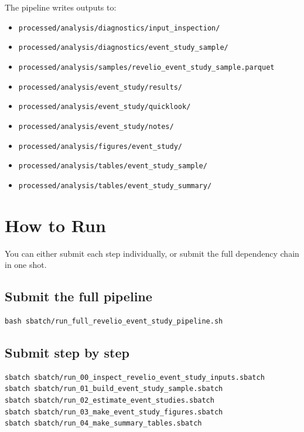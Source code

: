 \documentclass[11pt]{article}
\begin{document}
The pipeline writes outputs to:

\begin{itemize}[leftmargin=1.5em]
    \item \texttt{processed/analysis/diagnostics/input\_inspection/}
    \item \texttt{processed/analysis/diagnostics/event\_study\_sample/}
    \item \texttt{processed/analysis/samples/revelio\_event\_study\_sample.parquet}
    \item \texttt{processed/analysis/event\_study/results/}
    \item \texttt{processed/analysis/event\_study/quicklook/}
    \item \texttt{processed/analysis/event\_study/notes/}
    \item \texttt{processed/analysis/figures/event\_study/}
    \item \texttt{processed/analysis/tables/event\_study\_sample/}
    \item \texttt{processed/analysis/tables/event\_study\_summary/}
\end{itemize}

\section{How to Run}

You can either submit each step individually, or submit the full dependency chain in one shot.

\subsection*{Submit the full pipeline}

\begin{verbatim}
bash sbatch/run_full_revelio_event_study_pipeline.sh
\end{verbatim}

\subsection*{Submit step by step}

\begin{verbatim}
sbatch sbatch/run_00_inspect_revelio_event_study_inputs.sbatch
sbatch sbatch/run_01_build_event_study_sample.sbatch
sbatch sbatch/run_02_estimate_event_studies.sbatch
sbatch sbatch/run_03_make_event_study_figures.sbatch
sbatch sbatch/run_04_make_summary_tables.sbatch
\end{verbatim}
\end{document}

